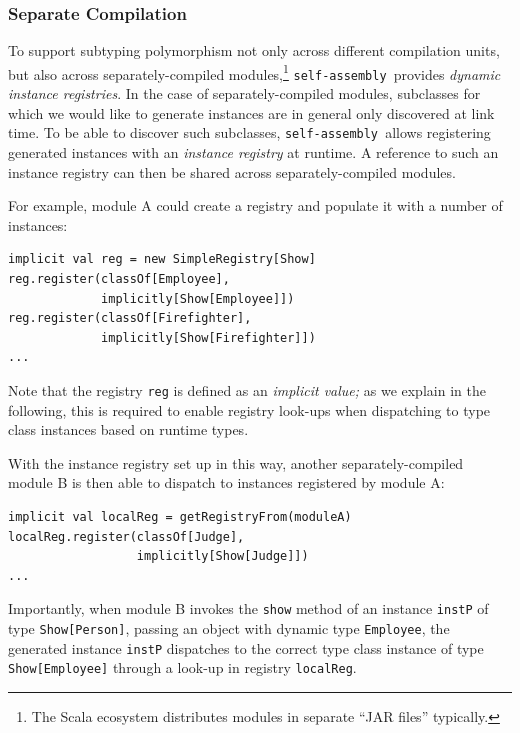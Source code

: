 \documentclass[preprint,nocopyrightspace]{sigplanconf}
\newcommand{\selfassembly}{\texttt{self-assembly~}}
\begin{document}


\subsubsection{Separate Compilation}\label{sec:oo-sub-sep}

To support subtyping polymorphism not only across different compilation units,
but also across separately-compiled modules,\footnote{The Scala ecosystem distributes modules in separate ``JAR files'' typically.}
\selfassembly provides \emph{dynamic instance registries}. In the case of
separately-compiled modules, subclasses for which we would like to generate
instances are in general only discovered at link time. To be able to discover
such subclasses, \selfassembly allows registering generated instances
with an \emph{instance registry} at runtime. A reference to such an
instance registry can then be shared across separately-compiled modules.

For example, module A could create a registry and populate it with a number of
instances:
\begin{lstlisting}
implicit val reg = new SimpleRegistry[Show]
reg.register(classOf[Employee],
             implicitly[Show[Employee]])
reg.register(classOf[Firefighter],
             implicitly[Show[Firefighter]])
...
\end{lstlisting}
\noindent
Note that the registry \verb|reg| is defined as an \emph{implicit value;} as we
explain in the following, this is required to enable registry look-ups when
dispatching to type class instances based on runtime types.

With the instance registry set up in this way, another separately-compiled
module B is then able to dispatch to instances registered by module A:

\begin{lstlisting}
implicit val localReg = getRegistryFrom(moduleA)
localReg.register(classOf[Judge],
                  implicitly[Show[Judge]])
...
\end{lstlisting}
\noindent
Importantly, when module B invokes the \verb|show| method of an instance
\verb|instP| of type \verb|Show[Person]|, passing an object with dynamic type
\verb|Employee|, the generated instance \verb|instP| dispatches to the correct
type class instance of type \verb|Show[Employee]| through a look-up in
registry \verb|localReg|.
\end{document}
